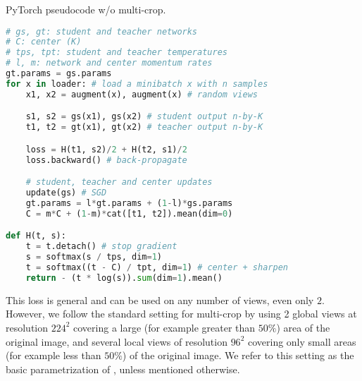 \begin{algorithm}[tb]
   \caption{\OURS PyTorch pseudocode w/o multi-crop.}
   \label{algo:DINO}
\begin{lstlisting}[language=python]
# gs, gt: student and teacher networks
# C: center (K)
# tps, tpt: student and teacher temperatures
# l, m: network and center momentum rates
gt.params = gs.params
for x in loader: # load a minibatch x with n samples
    x1, x2 = augment(x), augment(x) # random views

    s1, s2 = gs(x1), gs(x2) # student output n-by-K
    t1, t2 = gt(x1), gt(x2) # teacher output n-by-K

    loss = H(t1, s2)/2 + H(t2, s1)/2
    loss.backward() # back-propagate

    # student, teacher and center updates
    update(gs) # SGD
    gt.params = l*gt.params + (1-l)*gs.params
    C = m*C + (1-m)*cat([t1, t2]).mean(dim=0)

def H(t, s):
    t = t.detach() # stop gradient
    s = softmax(s / tps, dim=1)
    t = softmax((t - C) / tpt, dim=1) # center + sharpen
    return - (t * log(s)).sum(dim=1).mean()


\end{lstlisting}
\end{algorithm}
This loss is general and can be used on any number of views, even only $2$.
However, we follow the standard setting for multi-crop by using 2 global views at resolution $224^2$ covering a large (for example greater than $50\%$) area of the original image, and several local views of resolution $96^2$ covering only small areas (for example less than $50\%$) of the original image.
We refer to this setting as the basic parametrization of \OURS, unless mentioned otherwise.

